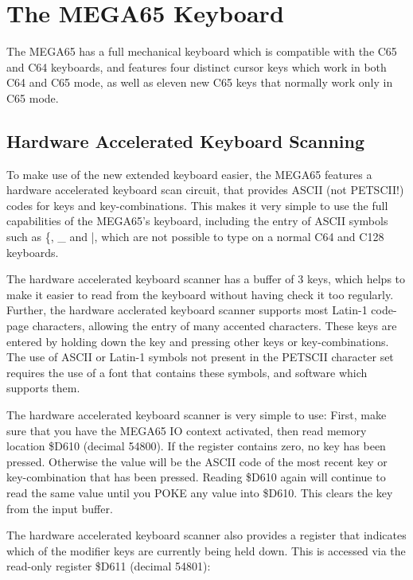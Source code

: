 
\chapter{The MEGA65 Keyboard}

The MEGA65 has a full mechanical keyboard which is compatible with the C65 and
C64 keyboards, and features four distinct cursor keys which work in both C64 and
C65 mode, as well as eleven new C65 keys that normally work only in C65 mode.

\section{Hardware Accelerated Keyboard Scanning}

To make use of the new extended keyboard easier, the MEGA65 features a hardware
accelerated keyboard scan circuit, that provides ASCII (not PETSCII!) codes for
keys and key-combinations.  This makes it very simple to use the full capabilities
of the MEGA65's keyboard, including the entry of ASCII symbols such as \{, \_ and |,
which are not possible to type on a normal C64 and C128 keyboards.

The hardware accelerated keyboard scanner has a buffer of 3 keys, which helps to
make it easier to read from the keyboard without having check it too regularly.
Further, the hardware acclerated keyboard scanner supports most Latin-1 code-page
characters, allowing the entry of many accented characters.  These keys are
entered by holding down the \megasymbolkey key and pressing other keys or key-combinations.
The use of ASCII or Latin-1 symbols not present in the PETSCII character set
requires the use  of a font that contains these symbols, and software which supports them.

The hardware accelerated keyboard scanner is very simple to use: First, make sure
that you have the MEGA65 IO context activated, then read memory location \$D610
(decimal 54800). If the register contains zero, no key has been pressed.  Otherwise the
value will be the ASCII code of the most recent key or key-combination that has
been pressed.  Reading \$D610 again will continue to read the same value until
you POKE any value into \$D610. This clears the key from the input buffer.

The hardware accelerated keyboard scanner also provides a register that
indicates which of the modifier keys are currently being held down.  This is
accessed via the read-only register \$D611 (decimal 54801):

